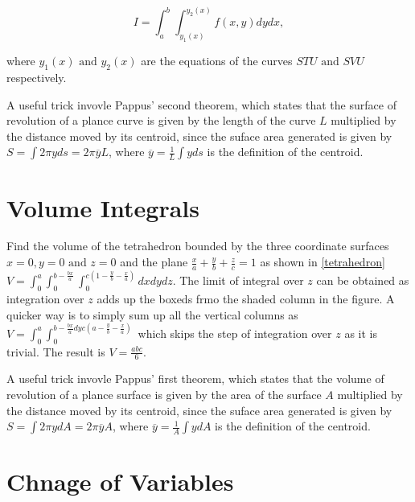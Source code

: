 \documentclass[english,a4paper,12pt]{report}
\begin{document}
\begin{equation}
    I = \int_{a}^{b} \int_{y_1 (x)}^{y_2 (x)} f(x,y) dy dx,
\end{equation}

where \(y_1 (x) \text { and } y_2 (x)\) are the equations of the curves \(STU \text { and } SVU\) respectively.   

A useful trick invovle Pappus' second theorem, which states that the surface of revolution of a plance curve is given by the length of the curve \(L\) multiplied by the distance moved by its centroid, since the suface area generated is given by \(S = \int 2\pi y ds = 2 \pi \overline{y} L\), where \(\overline{y} = \frac{1}{L} \int y ds \) is the definition of the centroid. 

\section{Volume Integrals}

{Find the volume of the tetrahedron bounded by the three coordinate surfaces \(x=0, y=0 \text { and }  z=0\) and the plane \(\frac{x}{a} + \frac{y}{b} + \frac{z}{c} =1\) as shown in \cref{tetrahedron}
 }
{\(V = \int_{0}^{a} \int_{0}^{b-\frac{bx}{a} } \int_{0}^{c(1-\frac{y}{b} - \frac{x}{a}  )} dxdydz\). The limit of integral over \(z\) can be obtained as integration over \(z\) adds up the boxeds frmo the shaded column in the figure. A quicker way is to simply sum up all the vertical columns as \(V = \int_{0}^{a} \int_{0}^{b-\frac{bx}{a} dy c \left( a-\frac{y}{b} - \frac{x}{a}\right)}\) which skips the step of integration over \(z\) as it is trivial. The result is \(V = \frac{abc}{6} \). } 


A useful trick invovle Pappus' first theorem, which states that the volume of revolution of a plance surface is given by the area of the surface \(A\) multiplied by the distance moved by its centroid, since the suface area generated is given by \(S = \int 2\pi y dA = 2 \pi \overline{y} A\), where \(\overline{y} = \frac{1}{A} \int y dA \) is the definition of the centroid. 

\section{Chnage of Variables}
\end{document}
